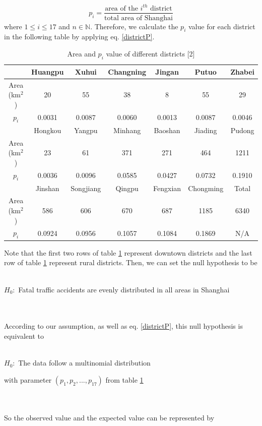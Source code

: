\documentclass[a4paper,12pt]{article}
\begin{document}
\begin{equation}\label{districtP}
p_i=\frac{\text{area of the }i^{th}\text{ district}}{\text{total area of Shanghai}}
\end{equation}
where $1\leq i\leq 17$ and $n\in\mathbb{N}$. Therefore, we calculate the $p_i$ value for each district in the following table by applying eq. \eqref{districtP}.
\begin{table}[H]\centering
\begin{tabular}{|c|c|c|c|c|c|c|}
\hline
&Huangpu&Xuhui&Changning&Jingan&Putuo&Zhabei\\ \hline
Area (km$^2$)&20&55&38&8&55&29\\ \hline
$p_i$&0.0031&0.0087&0.0060&0.0013&0.0087&0.0046\\ \hline\hline
&Hongkou &Yangpu&Minhang&Baoshan&Jiading&Pudong\\ \hline
Area (km$^2$)&23&61&371&271&464&1211\\ \hline
$p_i$&0.0036&0.0096&0.0585&0.0427&0.0732&0.1910\\ \hline\hline
&Jinshan &Songjiang&Qingpu&Fengxian&Chongming&Total\\ \hline
Area (km$^2$)&586&606&670&687&1185&6340\\ \hline
$p_i$&0.0924&0.0956&0.1057&0.1084&0.1869&N/A\\ \hline
\end{tabular}
\caption{Area and $p_i$ value of different districts [2]}
\label{table:area_p}
\end{table}
\noindent Note that the first two rows of table \ref{table:area_p} represent downtown districts and the last row of table \ref{table:area_p} represent rural districts. Then, we can set the null hypothesis to be
\\\\
\centerline{$H_0:$ Fatal traffic accidents are evenly distributed in all areas in Shanghai}
\\\\According to our assumption, as well as 
eq. \eqref{districtP}, this null hypothesis is equivalent to \\\\
\centerline{$H_0:$ The data follow a multinomial distribution}
\centerline{with parameter $(p_1,p_2,...,p_{17})$ from table \ref{table:area_p}}
 \\\\So the observed value and the expected value can be represented by
\end{document}
